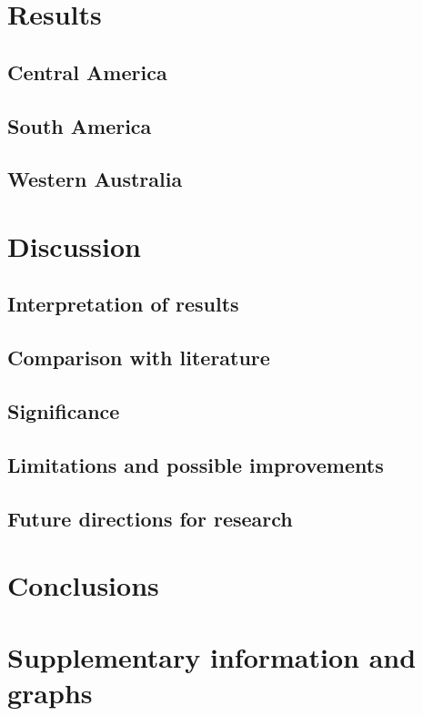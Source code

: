 \documentclass[12pt,a4paper,twoside]{book}
\begin{document}
	\chapter{Results}
	
\section{Central America}

\section{South America}

\section{Western Australia}

	\chapter{Discussion}
	
\section{Interpretation of results}

\section{Comparison with literature}

\section{Significance}

\section{Limitations and possible improvements}

\section{Future directions for research}

	\chapter{Conclusions}
	
\appendix

	\chapter{Supplementary information and graphs}
	
\end{document}

